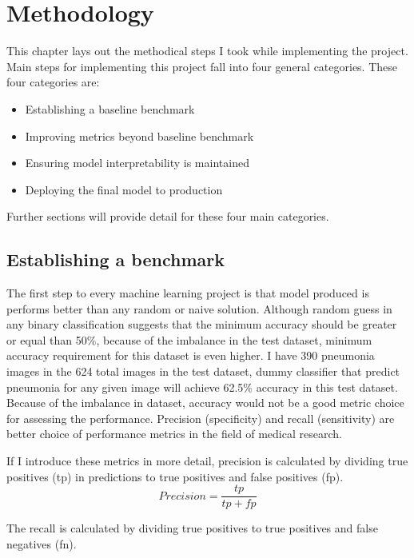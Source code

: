 \chapter{Methodology} \label{chap:methodology}
This chapter lays out the methodical steps I took while implementing the project.
Main steps for implementing this project fall into four general categories.
These four categories are:
\begin{itemize}
    \item Establishing a baseline benchmark
    \item Improving metrics beyond baseline benchmark
    \item Ensuring model interpretability is maintained
    \item Deploying the final model to production
\end{itemize}

Further sections will provide detail for these four main categories.

\section{Establishing a benchmark}
The first step to every machine learning project is that model produced is performs better than any random or naive solution.
Although random guess in any binary classification suggests that the minimum accuracy should be greater or equal than 50\%, because of the imbalance in the test dataset, minimum accuracy requirement for this dataset is even higher.
I have 390 pneumonia images in the 624 total images in the test dataset, dummy classifier that predict pneumonia for any given image will achieve 62.5\% accuracy in this test dataset.
Because of the imbalance in dataset, accuracy would not be a good metric choice for assessing the performance.
Precision (specificity) and recall (sensitivity) are better choice of performance metrics in the field of medical research.

If I introduce these metrics in more detail,
precision is calculated by dividing true positives (tp) in predictions to true positives and false positives (fp).
\begin{equation}
    Precision = \frac{tp}{tp + fp}
\end{equation}

The recall is calculated by dividing true positives to true positives and false negatives (fn).

